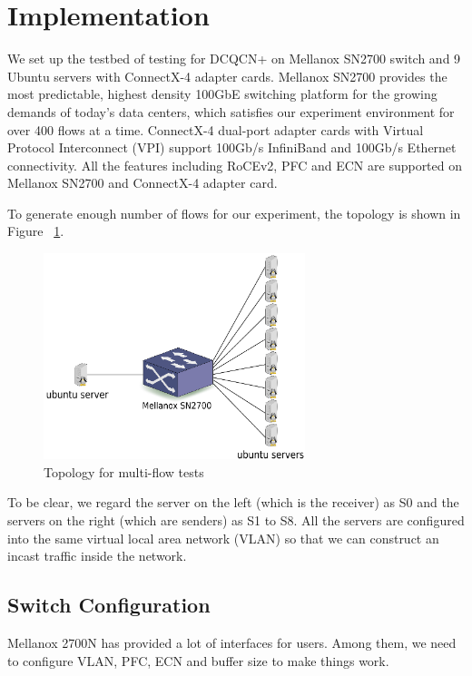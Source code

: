 \documentclass[12pt,a4paper]{article}
\begin{document}
\section{Implementation}

We set up the testbed of testing for DCQCN+ on Mellanox SN2700 switch and 9 Ubuntu servers with ConnectX-4 adapter cards.
Mellanox SN2700 provides the most predictable, highest density 100GbE switching platform for the growing demands of today's data centers,
which satisfies our experiment environment for over 400 flows at a time.
ConnectX-4 dual-port adapter cards with Virtual Protocol Interconnect (VPI) support 100Gb/s InfiniBand and 100Gb/s Ethernet connectivity.
All the features including RoCEv2, PFC and ECN are supported on Mellanox SN2700 and ConnectX-4 adapter card.

To generate enough number of flows for our experiment, the topology is shown in Figure ~\ref{fig:topology}.

\begin{figure}[h]
	\begin{center}
		\includegraphics[width=3in]{topology}
		\caption{Topology for multi-flow tests}
		\label{fig:topology}
	\end{center}
\end{figure}

To be clear, we regard the server on the left (which is the receiver) as S0 and the servers on the right (which are senders) as S1 to S8.
All the servers are configured into the same virtual local area network (VLAN) so that we can construct an incast traffic inside the network.

\subsection{Switch Configuration}

Mellanox 2700N has provided a lot of interfaces for users. Among them, we need to configure VLAN, PFC, ECN and buffer size to make things work.
\end{document}
